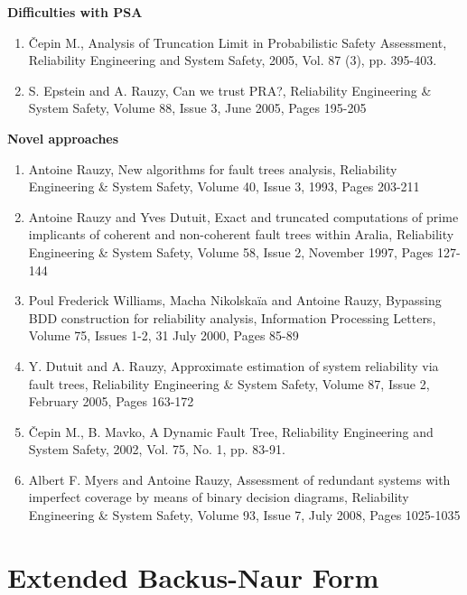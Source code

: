 \documentclass[11pt]{article}
\begin{document}
\textbf{Difficulties with PSA}

\begin{enumerate}
\item Čepin M., Analysis of Truncation Limit in Probabilistic Safety
Assessment, Reliability Engineering and System Safety, 2005, Vol. 87
(3), pp. 395-403.

\item S. Epstein and A. Rauzy, Can we trust PRA?, Reliability Engineering \&
System Safety, Volume 88, Issue 3, June 2005, Pages 195-205
\end{enumerate}



\textbf{Novel approaches}

\begin{enumerate}
\item Antoine Rauzy, New algorithms for fault trees analysis, Reliability
Engineering \& System Safety, Volume 40, Issue 3, 1993, Pages 203-211

\item Antoine Rauzy and Yves Dutuit, Exact and truncated computations of
prime implicants of coherent and non-coherent fault trees within
Aralia, Reliability Engineering \& System Safety, Volume 58, Issue 2,
November 1997, Pages 127-144

\item Poul Frederick Williams, Macha Nikolskaïa and Antoine Rauzy,
Bypassing BDD construction for reliability analysis, Information
Processing Letters, Volume 75, Issues 1-2, 31 July 2000, Pages 85-89

\item Y. Dutuit and A. Rauzy, Approximate estimation of system reliability
via fault trees, Reliability Engineering \& System Safety, Volume 87,
Issue 2, February 2005, Pages 163-172

\item Čepin M., B. Mavko, A Dynamic Fault Tree, Reliability Engineering and
System Safety, 2002, Vol. 75, No. 1, pp. 83-91.

\item Albert F. Myers and Antoine Rauzy, Assessment of redundant systems
with imperfect coverage by means of binary decision diagrams,
Reliability Engineering \& System Safety, Volume 93, Issue 7, July
2008, Pages 1025-1035
\end{enumerate}



\clearpage
\appendix

\section{Extended Backus-Naur Form}
\label{sec:org094afc7}
\end{document}
